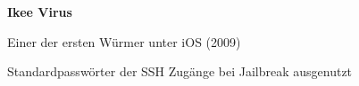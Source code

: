 \begin{frame}
	\centering
	\textbf{Ikee Virus}
	\begin{block}{}
		Einer der ersten Würmer unter iOS (2009)
	\end{block}
	\begin{block}{}
		Standardpasswörter der SSH Zugänge bei Jailbreak ausgenutzt
	\end{block}
	\begin{block}{}
		
	\end{block}
\end{frame}